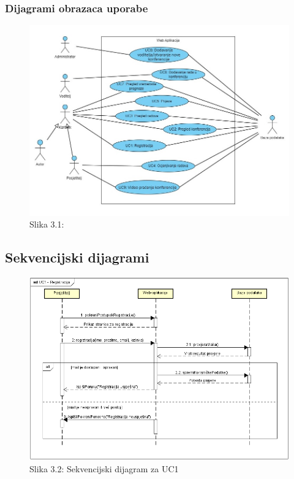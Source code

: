 				\subsubsection{Dijagrami obrazaca uporabe}
					
		\begin{figure}[H]
			\includegraphics[scale=0.55]{slike/UML1.JPG} 
			\centering
			\caption{Slika 3.1: }
			\label{UML1}
		\end{figure}		
				
			\subsection{Sekvencijski dijagrami}
				
		\begin{figure}[H]
			\includegraphics[scale=0.7]{slike/UC1.PNG} 
			\centering
			\caption{Slika 3.2: Sekvencijski dijagram za UC1}
			\label{fig:UC1}
		\end{figure}	

